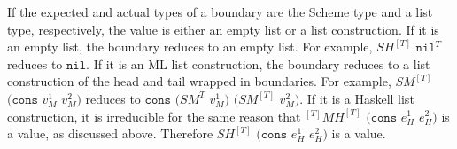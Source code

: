 If the expected and actual types of a boundary are the Scheme type and a list type, respectively, the value is either an empty list or a list construction.  If it is an empty list, the boundary reduces to an empty list.  For example, $SH^{[T]}$ $\mathtt{nil}^{T}$ reduces to $\mathtt{nil}$.  If it is an ML list construction, the boundary reduces to a list construction of the head and tail wrapped in boundaries.  For example, $SM^{[T]}$ $(\mathtt{cons}$ $v_{M}^{1}$ $v_{M}^{2})$ reduces to $\mathtt{cons}$ $(SM^{T}$ $v_{M}^{1})$ $(SM^{[T]}$ $v_{M}^{2})$.  If it is a Haskell list construction, it is irreducible for the same reason that $^{[T]}MH^{[T]}$ $(\mathtt{cons}$ $e_{H}^{1}$ $e_{H}^{2})$ is a value, as discussed above.  Therefore $SH^{[T]}$ $(\mathtt{cons}$ $e_{H}^{1}$ $e_{H}^{2})$ is a value.









